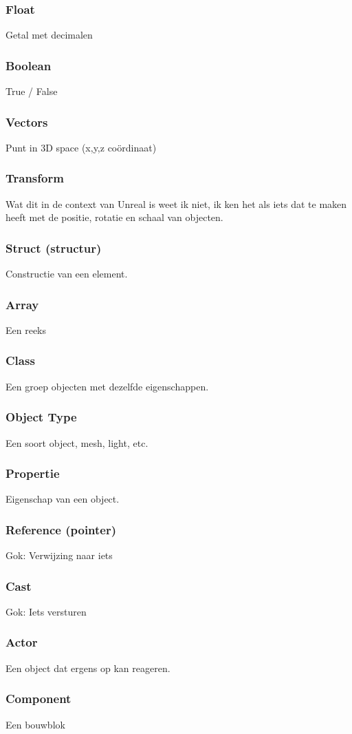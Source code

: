 \subsubsection*{Float}
Getal met decimalen
\subsubsection*{Boolean}
True / False
\subsubsection*{Vectors}
Punt in 3D space (x,y,z coördinaat)
\subsubsection*{Transform}
Wat dit in de context van Unreal is weet ik niet, ik ken het als iets dat te maken heeft met de positie, rotatie en schaal van objecten.
\subsubsection*{Struct (structur)}
Constructie van een element.
\subsubsection*{Array}
Een reeks
\subsubsection*{Class}
Een groep objecten met dezelfde eigenschappen.
\subsubsection*{Object Type}
Een soort object, mesh, light, etc.
\subsubsection*{Propertie}
Eigenschap van een object.
\subsubsection*{Reference (pointer)}
Gok: Verwijzing naar iets
\subsubsection*{Cast}
Gok: Iets versturen
\subsubsection*{Actor}
Een object dat ergens op kan reageren.
\subsubsection*{Component}
Een bouwblok